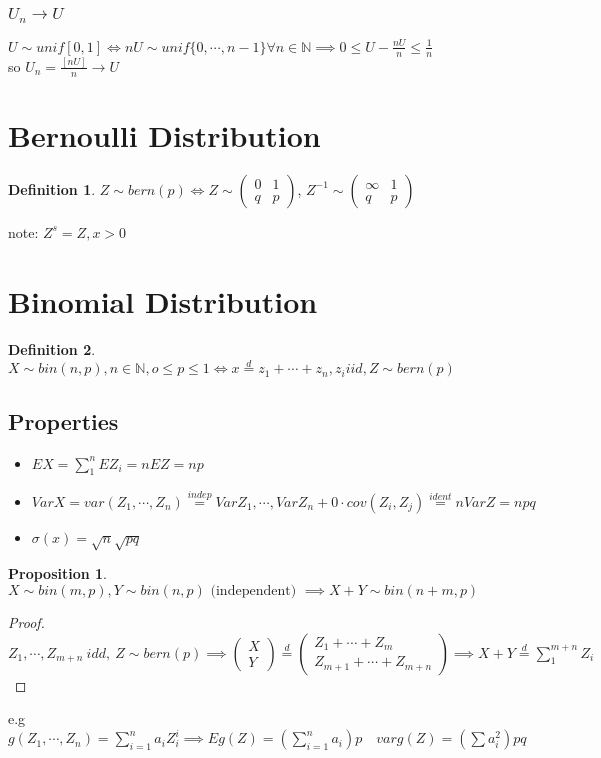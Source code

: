 \documentclass{article}
\theoremstyle{definition}
\newtheorem{definition}{Definition}[section]
\theoremstyle{thrm}
\theoremstyle{lma}
\theoremstyle{ppst}
\newtheorem{ppst}{Proposition}[section]
\theoremstyle{crlr}
\begin{document}
\subsubsection{$U_n \to U$}
$U\sim unif[0,1]\iff nU\sim unif\{0,\cdots,n-1\} \forall n\in \mathbb{N} \implies 0 \leq U-\frac{nU}{n}\leq \frac{1}{n}$\\
so $U_n = \frac{[nU]}{n}\to U$
\section{Bernoulli Distribution}
\begin{definition}
	$Z\sim bern(p) \iff Z\sim \begin{pmatrix}
		0 & 1\\
		q&p
	\end{pmatrix}$, $Z^{-1}\sim \begin{pmatrix}
		\infty & 1\\
		q&p
	\end{pmatrix}$
\end{definition}
note: $Z^s = Z, x>0$

\section{Binomial Distribution}
\begin{definition}
	$X\sim bin(n,p), n \in \mathbb{N}, o\leq p\leq 1 \iff x \stackrel{d}{=}z_1+\cdots+z_n, z_i iid, Z\sim bern(p)$
\end{definition}
\subsection{Properties}
\begin{itemize}
	\item $EX = \sum_1^nEZ_i = nEZ = np$
	\item $VarX=var(Z_1,\cdots, Z_n)\stackrel{indep}{=}VarZ_1, \cdots, VarZ_n+ 0 \cdot cov(Z_i,Z_j) \stackrel{ident}{=}nVarZ=npq $
	\item $\sigma(x) = \sqrt{n}\sqrt{pq}$
\end{itemize}
\begin{ppst}
	$X\sim bin(m,p),Y\sim bin(n,p)\text{ (independent) } \implies X+Y \sim bin(n+m, p)$
\end{ppst}
\begin{proof}
	$Z_1, \cdots, Z_{m+n} \ idd,\ Z\sim bern(p) \implies \begin{pmatrix}
		X\\Y
	\end{pmatrix}\stackrel{d}{=}\begin{pmatrix}
		Z_1+\cdots+Z_m\\Z_{m+1}+\cdots+Z_{m+n}
	\end{pmatrix} \implies X+Y \stackrel{d}{=}\sum_1^{m+n}Z_i$ 
\end{proof}
e.g $g(Z_1, \cdots, Z_n) = \sum_{i=1}^n a_iZ_i^i\implies Eg(Z)=(\sum_{i=1}^na_i)p \quad var g(Z) = (\sum a_i^2)pq$
\end{document}
